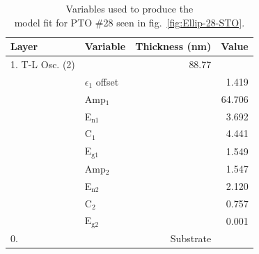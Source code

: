\begin{table}[htbp]
	\centering
	\caption[PTO \#28 Ellipsometric Model Variables]{Variables used to produce the\\model fit for PTO \#28 seen in fig.~\vref{fig:Ellip-28-STO}. \label{tbl:PTO-28-ellip-variables}}
	\begin{tabular}{l l r r}
	\toprule
	Layer&Variable&Thickness (nm)&Value\\
	\midrule
	1. T-L Osc. (2)&&88.77&\\
	&$\epsilon_{1}$ offset&&1.419\\
	&Amp$_{1}$&&64.706\\
	&E$_{\mathrm{n 1}}$&&3.692\\
	&C$_{1}$&&4.441\\
	&E$_{\mathrm{g1}}$&&1.549\\
	&Amp$_{2}$&&1.547\\
	&E$_{\mathrm{n 2}}$&&2.120\\
	&C$_{2}$&&0.757\\
	&E$_{\mathrm{g2}}$&&0.001\\
	0. \ce{STO}&&Substrate&\\
	\bottomrule
	\end{tabular}
\end{table}

